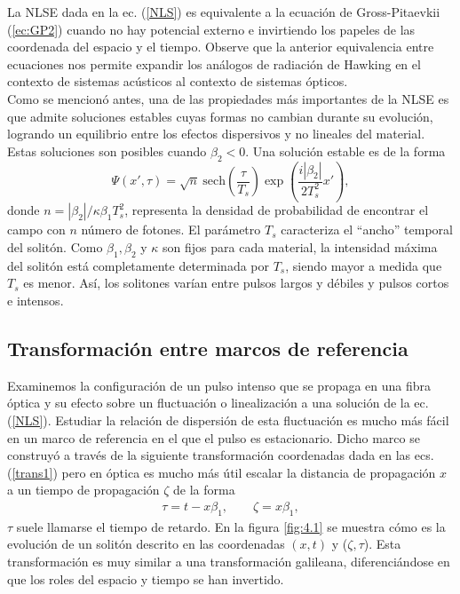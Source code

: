 La NLSE dada en la ec. (\ref{NLS}) es equivalente a la ecuaci\'{o}n de Gross-Pitaevkii (\ref{ec:GP2}) cuando no hay potencial externo e invirtiendo los papeles de las coordenada del espacio y el tiempo. Observe que la anterior equivalencia entre ecuaciones nos permite expandir los an\'{a}logos de radiaci\'{o}n de Hawking en el contexto de sistemas ac\'{u}sticos al contexto de sistemas \'{o}pticos.\\

Como se mencion\'{o} antes, una de las propiedades más importantes de la NLSE es que admite soluciones estables cuyas formas no cambian durante su evoluci\'{o}n, logrando un equilibrio entre los efectos dispersivos y no lineales del material. Estas soluciones son posibles cuando $\beta_2<0$. Una soluci\'{o}n estable es de la forma
\begin{equation}
\Psi(x',\tau)=\sqrt{n}\ \text{sech}\left(\frac{\tau}{T_s}\right)\exp\left(\frac{i|\beta_2|}{2T_s^2}x'\right),
\end{equation}
donde $n=|\beta_2|/\kappa \beta_1 T_s^2$, representa la densidad de probabilidad de encontrar el campo con $n$ n\'{u}mero de fotones. El parámetro $T_s$ caracteriza el ``ancho'' temporal del solitón. Como $\beta_1, \beta_2$ y $\kappa$ son fijos para cada material, la intensidad máxima del solitón está completamente determinada por $T_s$, siendo mayor a medida que $T_s$ es menor. Así, los solitones varían entre pulsos largos y débiles y pulsos cortos e intensos.
\subsection{Transformaci\'{o}n entre marcos de referencia}
Examinemos la configuración de un pulso intenso que se propaga en una fibra óptica y su efecto sobre un fluctuaci\'{o}n o linealizaci\'{o}n a una soluci\'{o}n de la ec. (\ref{NLS}). Estudiar la relaci\'{o}n de dispersi\'{o}n de esta fluctuaci\'{o}n es mucho más fácil en un marco de referencia en el que el pulso es estacionario. Dicho marco se construy\'{o} a través de la siguiente transformación coordenadas dada en las ecs. (\ref{trans1}) pero en \'{o}ptica es mucho m\'{a}s \'{u}til escalar la distancia de propagaci\'{o}n $x$ a un tiempo de propagaci\'{o}n $\zeta$ de la forma
\begin{align}\label{trans2}
\tau=t-x\beta_1, \qquad \zeta=x\beta_1,
\end{align}
 $\tau$ suele llamarse el tiempo de retardo. En la figura \ref{fig:4.1} se muestra c\'{o}mo es la evoluci\'{o}n de un solit\'{o}n descrito en las coordenadas $(x,t)$ y ($\zeta,\tau$). Esta transformaci\'{o}n es muy similar a una transformación galileana, diferenciándose en que los roles del espacio y tiempo se han invertido.\\
 
